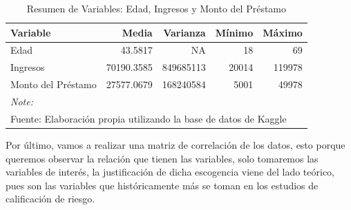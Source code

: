 \documentclass[
  letterpaper,
  DIV=11,
  numbers=noendperiod]{scrreprt}
\begin{document}
\begin{longtable}[t]{lrrrr}
\caption{Resumen de Variables: Edad, Ingresos y Monto del Préstamo}\\
\toprule
Variable & Media & Varianza & Mínimo & Máximo\\
\midrule
Edad & 43.5817 & NA & 18 & 69\\
Ingresos & 70190.3585 & 849685113 & 20014 & 119978\\
Monto del Préstamo & 27577.0679 & 168240584 & 5001 & 49978\\
\bottomrule
\multicolumn{5}{l}{\rule{0pt}{1em}\textit{Note: }}\\
\multicolumn{5}{l}{\rule{0pt}{1em}Fuente: Elaboración propia utilizando la base de datos de Kaggle}\\
\end{longtable}

Por último, vamos a realizar una matriz de correlación de los datos,
esto porque queremos observar la relación que tienen las variables, solo
tomaremos las variables de interés, la justificación de dicha escogencia
viene del lado teórico, pues son las variables que históricamente más se
toman en los estudios de calificación de riesgo.
\end{document}
